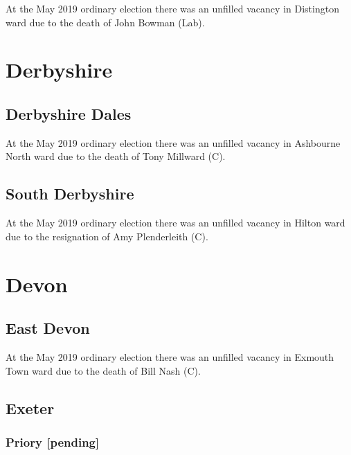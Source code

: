 \documentclass[a4paper,openany]{book}
\begin{document}
\begin{resultsiii}
At the May 2019 ordinary election there was an unfilled vacancy in Distington ward due to the death of John Bowman (Lab).

\section{Derbyshire}

\subsection*{Derbyshire Dales}

At the May 2019 ordinary election there was an unfilled vacancy in Ashbourne North ward due to the death of Tony Millward (C).

\subsection*{South Derbyshire}

At the May 2019 ordinary election there was an unfilled vacancy in Hilton ward due to the resignation of Amy Plenderleith (C).

\section{Devon}

\subsection*{East Devon}

At the May 2019 ordinary election there was an unfilled vacancy in Exmouth Town ward due to the death of Bill Nash (C).

\subsection*{Exeter}

\subsubsection*{Priory \hspace*{\fill}\nolinebreak[1]%
	\enspace\hspace*{\fill}
	[pending]}


\end{resultsiii}
\end{document}
